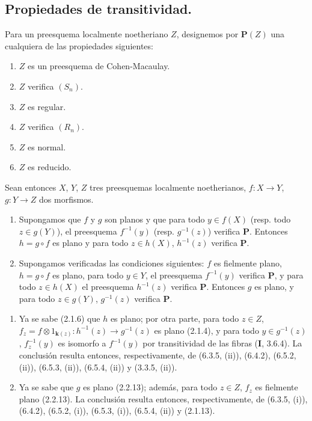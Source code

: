 
\subsection{Propiedades de transitividad.}

\begin{proposition}[6.6.1]
\label{IV.2.s6.6.1-fr}
Para un preesquema localmente noetheriano $Z$, designemos por $\boldsymbol{P}(Z)$ una
cualquiera de las propiedades siguientes:
\begin{enumerate}
\item[\textup{a)}] $Z$ es un preesquema de Cohen-Macaulay.
\item[\textup{b)}] $Z$ verifica $(S_n)$.
\item[\textup{c)}] $Z$ es regular.
\item[\textup{d)}] $Z$ verifica $(R_n)$.
\item[\textup{e)}] $Z$ es normal.
\item[\textup{f)}] $Z$ es reducido.
\end{enumerate}
Sean entonces $X$, $Y$, $Z$ tres preesquemas localmente noetherianos,
$f:X\to Y$, $g:Y\to Z$ dos morfismos.
\begin{enumerate}
\item[\textup{(i)}] Supongamos que $f$ y $g$ son planos y que para todo
$y\in f(X)$ \textup{(resp.} todo $z\in g(Y)$), el preesquema $f^{-1}(y)$
\textup{(resp.} $g^{-1}(z)$) verifica $\boldsymbol{P}$. Entonces $h=g\circ f$ es plano y para todo
$z\in h(X)$, $h^{-1}(z)$ verifica $\boldsymbol{P}$.
\item[\textup{(ii)}] Supongamos verificadas las condiciones siguientes: $f$ es
fielmente plano, $h=g\circ f$ es plano, para todo $y\in Y$, el
preesquema $f^{-1}(y)$ verifica $\boldsymbol{P}$, y para todo $z\in h(X)$ el
preesquema $h^{-1}(z)$ verifica $\boldsymbol{P}$. Entonces $g$ es plano, y para todo
$z\in g(Y)$, $g^{-1}(z)$ verifica $\boldsymbol{P}$.
\end{enumerate}
\end{proposition}

\begin{enumerate}
\item[(i)] Ya se sabe (2.1.6) que $h$ es plano; por otra parte, para todo
      $z\in Z$,
$f_z=f\otimes 1_{\mathbf{k}(z)}:h^{-1}(z)\longrightarrow g^{-1}(z)$ es plano (2.1.4), y para todo $y\in g^{-1}(z)$, $f_z^{-1}(y)$ es
isomorfo a $f^{-1}(y)$ por transitividad de las fibras (\textbf I, 3.6.4). La
conclusión resulta entonces, respectivamente, de (6.3.5, (ii)), (6.4.2),
(6.5.2, (ii)), (6.5.3, (ii)), (6.5.4, (ii)) y (3.3.5, (ii)).
\item[(ii)] Ya se sabe que $g$ es plano (2.2.13); además, para todo
      $z\in Z$, $f_z$ es fielmente plano (2.2.13). La conclusión
      resulta entonces, respectivamente, de (6.3.5, (i)), (6.4.2),
(6.5.2, (i)), (6.5.3, (i)), (6.5.4, (ii)) y (2.1.13).
\end{enumerate}

